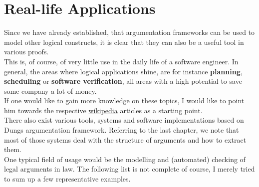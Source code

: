 \documentclass[12pt]{report}
\numberwithin{figure}{chapter}
\theoremstyle{break}
\begin{document}
\section{Real-life Applications}
Since we have already established, that argumentation frameworks can be used to model other logical constructs, it is clear that they can also be a useful tool in various proofs.\\
This is, of course, of very little use in the daily life of a software engineer. In general, the areas where logical applications shine, are for instance \textbf{planning},
\textbf{scheduling} or \textbf{software verification}, all areas with a high potential to save some company a lot of money.\\
If one would like to gain more knowledge on these topics, I would like to point him towards the respective \href{http://en.wikipedia.org/}{wikipedia} articles as a starting point.\\
\medskip
There also exist various tools, systems and software implementations based on Dungs argumentation framework. Referring to the last chapter, we note that most of those systems
deal with the structure of arguments and how to extract them.\\
One typical field of usage would be the modelling and (automated) checking of legal arguments in law.
The following list is not complete of course, I merely tried to sum up a few representative examples.
\medskip
\end{document}

